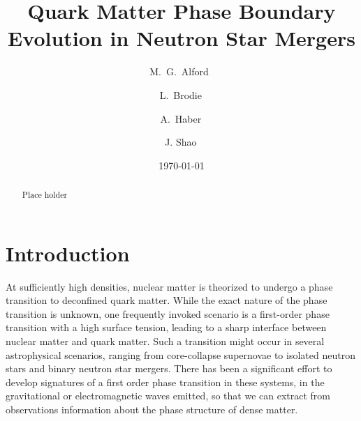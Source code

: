 \documentclass[10pt,superscriptaddress,
amsmath,aps,prc,twocolumn,nofootinbib,floatfix]{revtex4-1}
\begin{document}
\title{Quark Matter Phase Boundary Evolution in Neutron Star Mergers}
 \author{M.~G.~Alford \,}
 \author{L.~Brodie\,}
 \author{A.~Haber\,}
 \author{J. Shao\,}

\date{\today}

\begin{abstract}
Place holder
\end{abstract}

\maketitle

\section{Introduction}

At sufficiently high densities, nuclear matter is theorized to undergo a phase transition to deconfined quark matter. While the exact nature of the phase transition is unknown, one frequently invoked scenario is a first-order phase transition with a high surface tension, leading to a sharp interface between nuclear matter and quark matter. 
Such a transition might occur 
in several astrophysical scenarios, ranging from core-collapse supernovae to isolated neutron stars and binary neutron star mergers. There has been a significant effort to develop signatures of a first order phase transition in these systems, in the gravitational or electromagnetic waves emitted, so that we can extract from observations information about the phase structure of dense matter.
\end{document}

